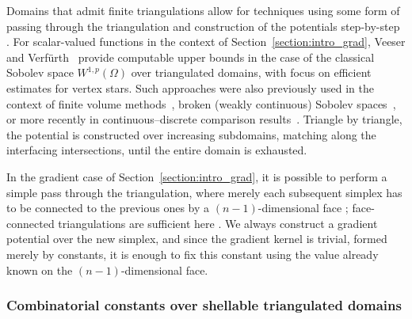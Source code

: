 \documentclass[10pt,letterpaper]{article}
\newcommand\cye[1]{%
  \protect\leavevmode
  \begingroup
    \color{red!35!yellow}%
    #1%
  \endgroup
}
\begin{document}
Domains that admit finite triangulations allow for techniques \cye{using some form of passing through the triangulation and construction of the potentials step-by-step}. For scalar-valued functions in the context of Section~\ref{section:intro_grad}, Veeser and Verf\"urth~\cite{veeser2012poincare} provide computable upper bounds in the case of the classical Sobolev space $W^{1,p}(\Omega)$ over triangulated domains, with focus on efficient estimates for \cye{vertex} stars. 
Such approaches were also previously used in the context of finite volume methods~\cite{Eym_Gal_Her_00}, broken (weakly continuous) Sobolev spaces~\cite{vohralik2005discrete}, or more recently in continuous--discrete comparison results~\cite{Brae_Pill_Sch_p_rob_09, ern2020stable, Chaum_Voh_p_rob_3D_H_curl_24,  Voh_loc_glob_H1_24}. Triangle by triangle, the potential is constructed over increasing subdomains, matching along the interfacing intersections, until the entire domain is exhausted.  

In the gradient case of Section~\ref{section:intro_grad}, it is possible to perform a simple pass through the triangulation, where merely each subsequent simplex has to be connected to the previous ones by a $(n-1)$-dimensional face\cye{; face-connected triangulations are sufficient here}. We always construct a gradient potential over the new simplex, and since the gradient kernel is trivial, formed merely by constants, it is enough to fix this constant using the value already known on the $(n-1)$-dimensional face.

\subsubsection{\cye{Combinatorial constants over shellable triangulated domains}}
\end{document}
